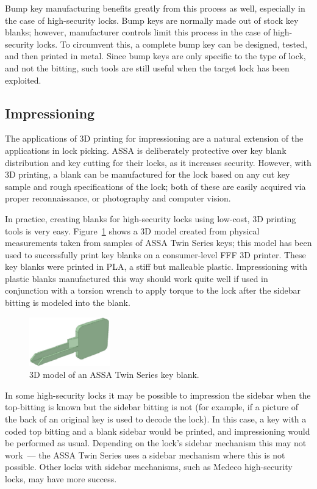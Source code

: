 \documentclass{acm_proc_article-sp}
\begin{document}
Bump key manufacturing benefits greatly from this process as well, especially in the case of high-security locks. Bump keys are normally made out of stock key blanks; however, manufacturer controls limit this process in the case of high-security locks. To circumvent this, a complete bump key can be designed, tested, and then printed in metal. Since bump keys are only specific to the type of lock, and not the bitting, such tools are still useful when the target lock has been exploited.

\subsection{Impressioning}
The applications of 3D printing for impressioning are a natural extension of the applications in lock picking. ASSA is deliberately protective over key blank distribution and key cutting for their locks, as it increases security. However, with 3D printing, a blank can be manufactured for the lock based on any cut key sample and rough specifications of the lock; both of these are easily acquired via proper reconnaissance, or photography and computer vision.

In practice, creating blanks for high-security locks using low-cost, 3D printing tools is very easy. Figure~\ref{model} shows a 3D model created from physical measurements taken from samples of ASSA Twin Series keys; this model has been used to successfully print key blanks on a consumer-level FFF 3D printer. These key blanks were printed in PLA, a stiff but malleable plastic. Impressioning with plastic blanks manufactured this way should work quite well if used in conjunction with a torsion wrench to apply torque to the lock after the sidebar bitting is modeled into the blank.

\begin{figure}[htb]
    \centering
    \includegraphics{model}
    \caption{3D model of an ASSA Twin Series key blank.}
    \label{model}
\end{figure}

In some high-security locks it may be possible to impression the sidebar when the top-bitting is known but the sidebar bitting is not (for example, if a picture of the back of an original key is used to decode the lock). In this case, a key with a coded top bitting and a blank sidebar would be printed, and impressioning would be performed as usual. Depending on the lock's sidebar mechanism this may not work~--- the ASSA Twin Series uses a sidebar mechanism where this is not possible. Other locks with sidebar mechanisms, such as Medeco high-security locks, may have more success.
\end{document}
